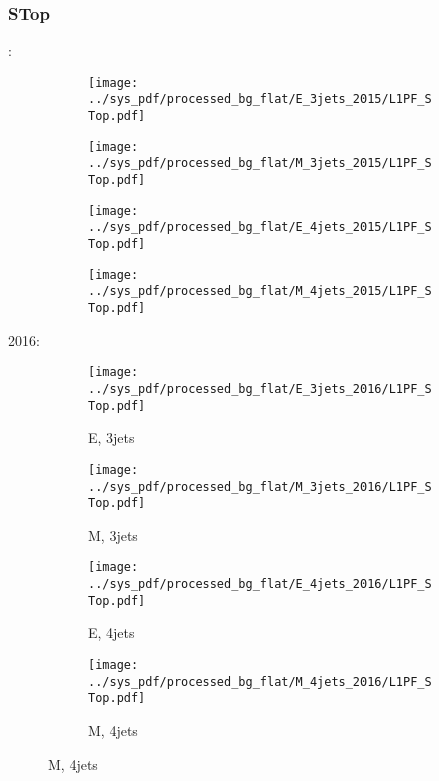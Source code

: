 \documentclass{beamer}
\begin{document}
\begin{frame}
\frametitle{STop}
\fontsize{5}{1}:
\begin{figure}
\centering
\begin{subfigure}[b]{0.24\textwidth}
\texttt{[image: ../sys\_pdf/processed\_bg\_flat/E\_3jets\_2015/L1PF\_STop.pdf]}
\end{subfigure}
\begin{subfigure}[b]{0.24\textwidth}
\texttt{[image: ../sys\_pdf/processed\_bg\_flat/M\_3jets\_2015/L1PF\_STop.pdf]}
\end{subfigure}
\begin{subfigure}[b]{0.24\textwidth}
\texttt{[image: ../sys\_pdf/processed\_bg\_flat/E\_4jets\_2015/L1PF\_STop.pdf]}
\end{subfigure}
\begin{subfigure}[b]{0.24\textwidth}
\texttt{[image: ../sys\_pdf/processed\_bg\_flat/M\_4jets\_2015/L1PF\_STop.pdf]}
\end{subfigure}
\end{figure}
2016:
\begin{figure}
\centering
\begin{subfigure}[b]{0.24\textwidth}
\texttt{[image: ../sys\_pdf/processed\_bg\_flat/E\_3jets\_2016/L1PF\_STop.pdf]}
\captionsetup{font=tiny}
\caption{E, 3jets}
\end{subfigure}
\begin{subfigure}[b]{0.24\textwidth}
\texttt{[image: ../sys\_pdf/processed\_bg\_flat/M\_3jets\_2016/L1PF\_STop.pdf]}
\captionsetup{font=tiny}
\caption{M, 3jets}
\end{subfigure}
\begin{subfigure}[b]{0.24\textwidth}
\texttt{[image: ../sys\_pdf/processed\_bg\_flat/E\_4jets\_2016/L1PF\_STop.pdf]}
\captionsetup{font=tiny}
\caption{E, 4jets}
\end{subfigure}
\begin{subfigure}[b]{0.24\textwidth}
\texttt{[image: ../sys\_pdf/processed\_bg\_flat/M\_4jets\_2016/L1PF\_STop.pdf]}
\captionsetup{font=tiny}
\caption{M, 4jets}
\end{subfigure}
\end{figure}
\end{frame}
\end{document}
